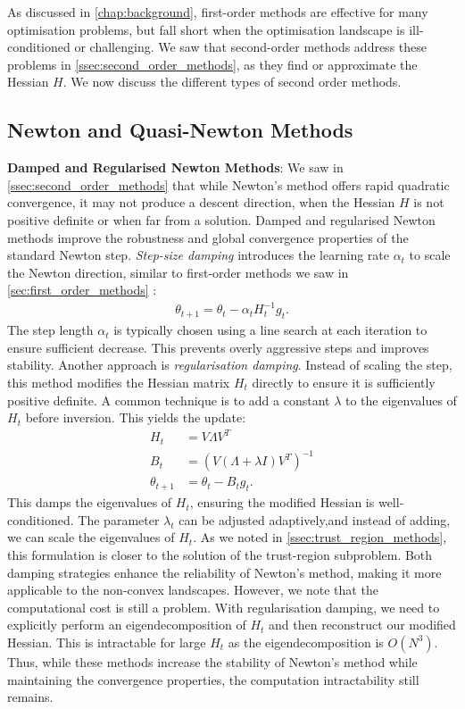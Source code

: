 As discussed in \cref{chap:background}, first-order methods are effective for many optimisation problems, but fall short when the optimisation landscape is ill-conditioned or challenging. We saw that second-order methods address these problems in \cref{ssec:second_order_methods}, as they find or approximate the Hessian $H$. We now discuss the different types of second order methods. 

\subsection{Newton and Quasi-Newton Methods} 
\label{ssec:newton_methods}

\textbf{Damped and Regularised Newton Methods}:
We saw in \cref{ssec:second_order_methods} that while Newton's method offers rapid quadratic convergence, it may not produce a descent direction, when the Hessian $H$ is not positive definite or when far from a solution. Damped and regularised Newton methods improve the robustness and global convergence properties of the standard Newton step. \textit{Step-size damping} introduces the learning rate $\alpha_t$ to scale the Newton direction, similar to first-order methods we saw in \cref{sec:first_order_methods} \citep{sun2019survey}:
\begin{align}
    \theta_{t+1} = \theta_t - \alpha_t H_t^{-1} g_t.
\end{align}
The step length $\alpha_t$ is typically chosen using a line search at each iteration to ensure sufficient decrease. This prevents overly aggressive steps and improves stability. Another approach is \textit{regularisation damping}. Instead of scaling the step, this method modifies the Hessian matrix $H_t$ directly to ensure it is sufficiently positive definite. A common technique is to add a constant $\lambda$ to the eigenvalues of $H_t$ before inversion. This yields the update:
\begin{align}
    H_t &= V \Lambda V^T \\
    B_t &= (V (\Lambda + \lambda I) V^T)^{-1} \\
    \theta_{t+1} &= \theta_t - B_t g_t.
\end{align}
This damps the eigenvalues of $H_t$, ensuring the modified Hessian is well-conditioned. The parameter $\lambda_t$ can be adjusted adaptively,and instead of adding, we can scale the eigenvalues of $H_t$. As we noted in \cref{ssec:trust_region_methods}, this formulation is closer to the solution of the trust-region subproblem. Both damping strategies enhance the reliability of Newton's method, making it more applicable to the non-convex landscapes. However, we note that the computational cost is still a problem. With regularisation damping, we need to explicitly perform an eigendecomposition of $H_t$ and then reconstruct our modified Hessian. This is intractable for large $H_t$ as the eigendecomposition is $O(N^3)$. Thus, while these methods increase the stability of Newton's method while maintaining the convergence properties, the computation intractability still remains.

